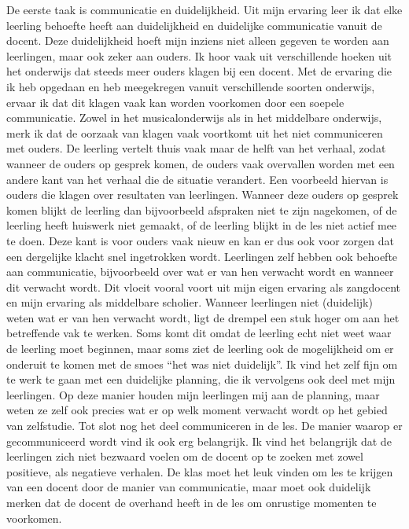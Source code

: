 \documentclass{article}
\begin{document}
{                De eerste taak is communicatie en duidelijkheid. Uit mijn ervaring leer ik dat elke leerling behoefte heeft aan duidelijkheid en duidelijke communicatie vanuit de docent. Deze duidelijkheid hoeft mijn inziens niet alleen gegeven te worden aan leerlingen, maar ook zeker aan ouders. Ik hoor vaak uit verschillende hoeken uit het onderwijs dat steeds meer ouders klagen bij een docent. Met de ervaring die ik heb opgedaan en heb meegekregen vanuit verschillende soorten onderwijs, ervaar ik dat dit klagen vaak kan worden voorkomen door een soepele communicatie. Zowel in het musicalonderwijs als in het middelbare onderwijs, merk ik dat de oorzaak van klagen vaak voortkomt uit het niet communiceren met ouders. De leerling vertelt thuis vaak maar de helft van het verhaal, zodat wanneer de ouders op gesprek komen, de ouders vaak overvallen worden met een andere kant van het verhaal die de situatie verandert. Een voorbeeld hiervan is ouders die klagen over resultaten van leerlingen. Wanneer deze ouders op gesprek komen blijkt de leerling dan bijvoorbeeld afspraken niet te zijn nagekomen, of de leerling heeft huiswerk niet gemaakt, of de leerling blijkt in de les niet actief mee te doen. Deze kant is voor ouders vaak nieuw en kan er dus ook voor zorgen dat een dergelijke klacht snel ingetrokken wordt.
                Leerlingen zelf hebben ook behoefte aan communicatie, bijvoorbeeld over wat er van hen verwacht wordt en wanneer dit verwacht wordt. Dit vloeit vooral voort uit mijn eigen ervaring als zangdocent en mijn ervaring als middelbare scholier. Wanneer leerlingen niet (duidelijk) weten wat er van hen verwacht wordt, ligt de drempel een stuk hoger om aan het betreffende vak te werken. Soms komt dit omdat de leerling echt niet weet waar de leerling moet beginnen, maar soms ziet de leerling ook de mogelijkheid om er onderuit te komen met de smoes “het was niet duidelijk”. 
                Ik vind het zelf fijn om te werk te gaan met een duidelijke planning, die ik vervolgens ook deel met mijn leerlingen. Op deze manier houden mijn leerlingen mij aan de planning, maar weten ze zelf ook precies wat er op welk moment verwacht wordt op het gebied van zelfstudie. 
                Tot slot nog het deel communiceren in de les. De manier waarop er gecommuniceerd wordt vind ik ook erg belangrijk. Ik vind het belangrijk dat de leerlingen zich niet bezwaard voelen om de docent op te zoeken met zowel positieve, als negatieve verhalen. De klas moet het leuk vinden om les te krijgen van een docent door de manier van communicatie, maar moet ook duidelijk merken dat de docent de overhand heeft in de les om onrustige momenten te voorkomen.
                
}
\end{document}
